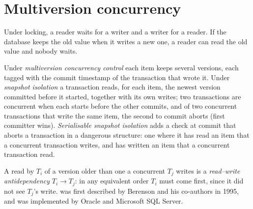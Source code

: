 \section{Multiversion concurrency}\label{sec:b3:transactions-and-recovery:mvcc}

Under locking, a reader waits for a writer and a writer for a reader. If the database keeps the old value when it writes a new one, a reader can read the old value and nobody waits.

\begin{definition}\label{def:b3:transactions-and-recovery:mvcc}
Under \emph{multiversion concurrency control} each item keeps several versions, each tagged with the commit timestamp of the transaction that wrote it. Under \emph{snapshot isolation} a transaction reads, for each item, the newest version committed before it started, together with its own writes; two transactions are concurrent when each starts before the other commits, and of two concurrent transactions that write the same item, the second to commit aborts (first committer wins). \emph{Serialisable snapshot isolation} adds a check at commit that aborts a transaction in a dangerous structure: one where it has read an item that a concurrent transaction writes, and has written an item that a concurrent transaction read.
\end{definition}

A read by $T_i$ of a version older than one a concurrent $T_j$ writes is a \emph{read--write antidependency} $T_i \to T_j$: in any equivalent  order $T_i$ must come first, since it did not see $T_j$'s write.  was first described by Berenson and his co-authors in 1995, and was implemented by Oracle and Microsoft SQL Server. %

\label{lst:b3:transactions-and-recovery:mvcc}

\label{out:b3:transactions-and-recovery:mvcc}

